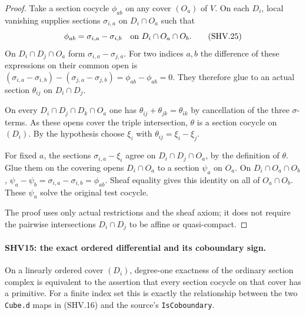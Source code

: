 \documentclass[11pt,a4paper]{article}
\numberwithin{equation}{section}
\theoremstyle{remark}\newtheorem{remark}[theorem]{Remark}
\begin{document}
\begin{proof}
Take a section cocycle $\phi_{ab}$ on any cover $(O_a)$ of $V$.
On each $D_i$, local vanishing supplies sections
$\sigma_{i,a}$ on $D_i\cap O_a$ such that
\[
                 \phi_{ab}=\sigma_{i,a}-\sigma_{i,b}
                 \quad\hbox{on }D_i\cap O_a\cap O_b.
                                                        \tag{SHV.25}
\]
On $D_i\cap D_j\cap O_a$ form
$\sigma_{i,a}-\sigma_{j,a}$.
For two indices $a,b$ the difference of these expressions on
their common open is
$(\sigma_{i,a}-\sigma_{i,b})
 -(\sigma_{j,a}-\sigma_{j,b})=\phi_{ab}-\phi_{ab}=0$.
They therefore glue to an actual section
$\theta_{ij}$ on $D_i\cap D_j$.

On every $D_i\cap D_j\cap D_k\cap O_a$ one has
$\theta_{ij}+\theta_{jk}=\theta_{ik}$ by cancellation of
the three $\sigma$-terms.  As these opens cover the triple
intersection, $\theta$ is a section cocycle on $(D_i)$.
By the hypothesis choose $\xi_i$ with
$\theta_{ij}=\xi_i-\xi_j$.

For fixed $a$, the sections
$\sigma_{i,a}-\xi_i$ agree on
$D_i\cap D_j\cap O_a$, by the definition of $\theta$.
Glue them on the covering opens $D_i\cap O_a$ to a section
$\psi_a$ on $O_a$.  On $D_i\cap O_a\cap O_b$,
$\psi_a-\psi_b=\sigma_{i,a}-\sigma_{i,b}=\phi_{ab}$.
Sheaf equality gives this identity on all of $O_a\cap O_b$.
These $\psi_a$ solve the original test cocycle.

The proof uses only actual restrictions and the sheaf axiom;
it does not require the pairwise intersections $D_i\cap D_j$
to be affine or quasi-compact.
\end{proof}

\paragraph{SHV15: the exact ordered differential and its coboundary sign.}
\label{claim:SHV15}
On a linearly ordered cover $(D_i)$, degree-one exactness of
the ordinary section complex is equivalent to the assertion
that every section cocycle on that cover has a primitive.
For a finite index set this is exactly the relationship between
the two \texttt{Cube.\allowbreak d} maps in (SHV.16) and the source's
\texttt{Is\allowbreak Coboundary}.
\end{document}
